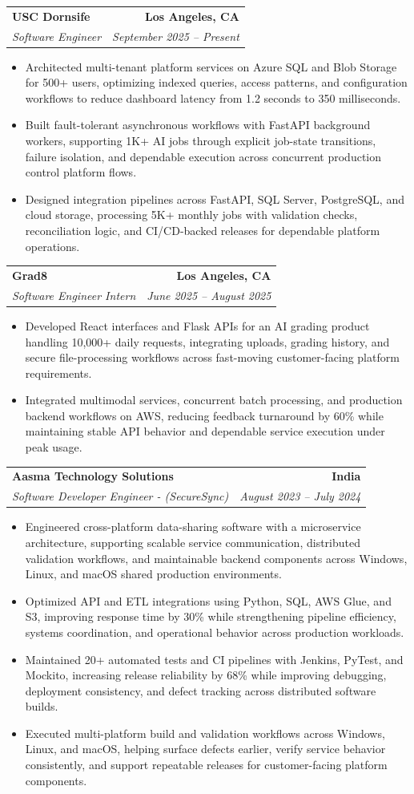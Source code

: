 \documentclass[letterpaper,10pt]{article}
\makeatletter
\newcommand{\resumeItem}[1]{\item\small{{#1 \vspace{-2pt}}}}
\newcommand{\resumeSubheading}[4]{\vspace{-1pt}\item\begin{tabular*}{1.0\textwidth}[t]{l@{\extracolsep{\fill}}r}\textbf{#1} & \textbf{\small #2} \\\textit{\small#3} & \textit{\small #4} \\\end{tabular*}\vspace{-2pt}}
\newcommand{\resumeItemListStart}{\begin{itemize}[leftmargin=0.15in,label=\textbullet,itemsep=2pt,topsep=0pt,parsep=0pt,partopsep=0pt]}
\newcommand{\resumeItemListEnd}{\end{itemize}\vspace{-4pt}}
\makeatother
\begin{document}
\resumeSubheading{USC Dornsife}{Los Angeles, CA}{Software Engineer}{September 2025 -- Present}
\resumeItemListStart
\resumeItem{Architected multi-tenant platform services on Azure SQL and Blob Storage for 500+ users, optimizing indexed queries, access patterns, and configuration workflows to reduce dashboard latency from 1.2 seconds to 350 milliseconds.}
\resumeItem{Built fault-tolerant asynchronous workflows with FastAPI background workers, supporting 1K+ AI jobs through explicit job-state transitions, failure isolation, and dependable execution across concurrent production control platform flows.}
\resumeItem{Designed integration pipelines across FastAPI, SQL Server, PostgreSQL, and cloud storage, processing 5K+ monthly jobs with validation checks, reconciliation logic, and CI/CD-backed releases for dependable platform operations.}
\resumeItemListEnd

\resumeSubheading{Grad8}{Los Angeles, CA}{Software Engineer Intern}{June 2025 -- August 2025}
\resumeItemListStart
\resumeItem{Developed React interfaces and Flask APIs for an AI grading product handling 10,000+ daily requests, integrating uploads, grading history, and secure file-processing workflows across fast-moving customer-facing platform requirements.}
\resumeItem{Integrated multimodal services, concurrent batch processing, and production backend workflows on AWS, reducing feedback turnaround by 60\% while maintaining stable API behavior and dependable service execution under peak usage.}
\resumeItemListEnd

\resumeSubheading{Aasma Technology Solutions}{India}{Software Developer Engineer - (SecureSync)}{August 2023 -- July 2024}
\resumeItemListStart
\resumeItem{Engineered cross-platform data-sharing software with a microservice architecture, supporting scalable service communication, distributed validation workflows, and maintainable backend components across Windows, Linux, and macOS shared production environments.}
\resumeItem{Optimized API and ETL integrations using Python, SQL, AWS Glue, and S3, improving response time by 30\% while strengthening pipeline efficiency, systems coordination, and operational behavior across production workloads.}
\resumeItem{Maintained 20+ automated tests and CI pipelines with Jenkins, PyTest, and Mockito, increasing release reliability by 68\% while improving debugging, deployment consistency, and defect tracking across distributed software builds.}
\resumeItem{Executed multi-platform build and validation workflows across Windows, Linux, and macOS, helping surface defects earlier, verify service behavior consistently, and support repeatable releases for customer-facing platform components.}
\resumeItemListEnd
\end{document}
